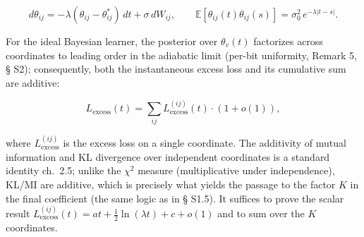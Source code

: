 \documentclass[12pt]{iopart}
\begin{document}
\[d\theta_{ij} = -\lambda(\theta_{ij}-\theta_{ij}^*)\,dt + \sigma\,dW_{ij}, \qquad \mathbb{E}[\theta_{ij}(t)\theta_{ij}(s)] = \sigma_0^2\,e^{-\lambda|t-s|}.\]



For the ideal Bayesian learner, the posterior over \(\theta_v(t)\) factorizes across coordinates to leading order in the adiabatic limit (per-bit uniformity, \cite{Andriishin2026b} Remark 5, § S2); consequently, both the instantaneous excess loss and its cumulative sum are additive:



\begin{equation}L_{\text{excess}}(t) = \sum_{ij} L_{\text{excess}}^{(ij)}(t) \cdot (1 + o(1)), \tag{S1.1}\end{equation}



where \(L_{\text{excess}}^{(ij)}\) is the excess loss on a single coordinate. The additivity of mutual information and KL divergence over independent coordinates is a standard identity \cite{CoverThomas2006} ch.~2.5; unlike the \(\chi^2\) measure (multiplicative under independence), KL/MI are additive, which is precisely what yields the passage to the factor \(K\) in the final coefficient (the same logic as in \cite{Andriishin2026b} § S1.5). It suffices to prove the scalar result \(L_{\text{excess}}^{(ij)}(t) = a t + \tfrac12\ln(\lambda t) + c + o(1)\) and to sum over the \(K\) coordinates.
\end{document}
